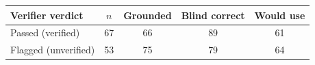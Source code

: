 \begin{tabular}{@{}lcccc@{}}
\toprule
Verifier verdict & $n$ & Grounded & Blind correct & Would use \\
\midrule
Passed (verified) & 67 & 66 & 89 & 61 \\
Flagged (unverified) & 53 & 75 & 79 & 64 \\
\bottomrule
\end{tabular}
